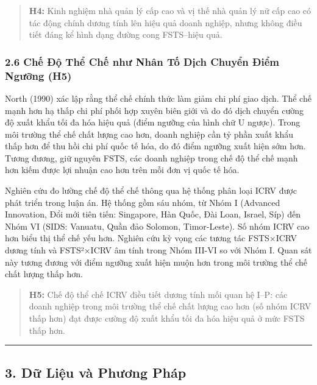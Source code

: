 \documentclass[12pt,a4paper]{article}
\begin{document}
\begin{quote}
\textbf{H4:} Kinh nghiệm nhà quản lý cấp cao và vị thế nhà quản lý nữ
cấp cao có tác động chính dương tính lên hiệu quả doanh nghiệp, nhưng
không điều tiết đáng kể hình dạng đường cong FSTS--hiệu quả.
\end{quote}

\hypertarget{26-chux1ebf-ux111ux1ed9-thux1ec3-chux1ebf-nhux1b0-nhuxe2n-tux1ed1-dux1ecbch-chuyux1ec3n-ux111iux1ec3m-ngux1b0ux1ee1ng-h5}{%
\subsubsection{2.6 Chế Độ Thể Chế như Nhân Tố Dịch Chuyển Điểm Ngưỡng
(H5)}\label{26-chux1ebf-ux111ux1ed9-thux1ec3-chux1ebf-nhux1b0-nhuxe2n-tux1ed1-dux1ecbch-chuyux1ec3n-ux111iux1ec3m-ngux1b0ux1ee1ng-h5}}

North (1990) xác lập rằng thể chế chính thức làm giảm chi phí giao dịch.
Thể chế mạnh hơn hạ thấp chi phí phối hợp xuyên biên giới và do đó dịch
chuyển cường độ xuất khẩu tối đa hóa hiệu quả (điểm ngưỡng của hình chữ
U ngược). Trong môi trường thể chế chất lượng cao hơn, doanh nghiệp cần
tỷ phần xuất khẩu thấp hơn để thu hồi chi phí quốc tế hóa, do đó điểm
ngưỡng xuất hiện sớm hơn. Tương đương, giữ nguyên FSTS, các doanh nghiệp
trong chế độ thể chế mạnh hơn kiếm được lợi nhuận cao hơn trên mỗi đơn
vị quốc tế hóa.

Nghiên cứu đo lường chế độ thể chế thông qua hệ thống phân loại ICRV
được phát triển trong luận án. Hệ thống gồm sáu nhóm, từ Nhóm I
(Advanced Innovation, Đổi mới tiên tiến: Singapore, Hàn Quốc, Đài Loan,
Israel, Síp) đến Nhóm VI (SIDS: Vanuatu, Quần đảo Solomon, Timor-Leste).
Số nhóm ICRV cao hơn biểu thị thể chế yếu hơn. Nghiên cứu kỳ vọng các
tương tác FSTS×ICRV dương tính và FSTS²×ICRV âm tính trong Nhóm III-VI
so với Nhóm I. Quan sát này tương đương với điểm ngưỡng xuất hiện muộn
hơn trong môi trường thể chế chất lượng thấp hơn.

\begin{quote}
\textbf{H5:} Chế độ thể chế ICRV điều tiết dương tính mối quan hệ I--P:
các doanh nghiệp trong môi trường thể chế chất lượng cao hơn (số nhóm
ICRV thấp hơn) đạt được cường độ xuất khẩu tối đa hóa hiệu quả ở mức
FSTS thấp hơn.
\end{quote}

\begin{center}\rule{0.5\linewidth}{0.5pt}\end{center}

\hypertarget{3-dux1eef-liux1ec7u-vuxe0-phux1b0ux1a1ng-phuxe1p}{%
\subsection{3. Dữ Liệu và Phương
Pháp}\label{3-dux1eef-liux1ec7u-vuxe0-phux1b0ux1a1ng-phuxe1p}}
\end{document}
